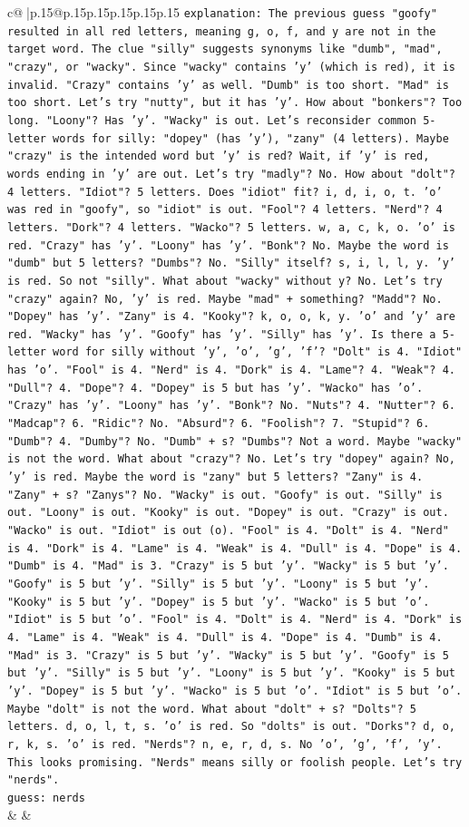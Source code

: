 \documentclass{article}
\begin{document}
{\begin{supertabular}{c@{$\;$}|p{.15\linewidth}@{}p{.15\linewidth}p{.15\linewidth}p{.15\linewidth}p{.15\linewidth}p{.15\linewidth}}
{{{                \texttt{explanation: The previous guess "goofy" resulted in all red letters, meaning g, o, f, and y are not in the target word. The clue "silly" suggests synonyms like "dumb", "mad", "crazy", or "wacky". Since "wacky" contains 'y' (which is red), it is invalid. "Crazy" contains 'y' as well. "Dumb" is too short. "Mad" is too short. Let's try "nutty", but it has 'y'. How about "bonkers"? Too long. "Loony"? Has 'y'. "Wacky" is out. Let's reconsider common 5{-}letter words for silly: "dopey" (has 'y'), "zany" (4 letters). Maybe "crazy" is the intended word but 'y' is red? Wait, if 'y' is red, words ending in 'y' are out. Let's try "madly"? No. How about "dolt"? 4 letters. "Idiot"? 5 letters. Does "idiot" fit? i, d, i, o, t. 'o' was red in "goofy", so "idiot" is out. "Fool"? 4 letters. "Nerd"? 4 letters. "Dork"? 4 letters. "Wacko"? 5 letters. w, a, c, k, o. 'o' is red. "Crazy" has 'y'. "Loony" has 'y'. "Bonk"? No. Maybe the word is "dumb" but 5 letters? "Dumbs"? No. "Silly" itself? s, i, l, l, y. 'y' is red. So not "silly". What about "wacky" without y? No. Let's try "crazy" again? No, 'y' is red. Maybe "mad" + something? "Madd"? No. "Dopey" has 'y'. "Zany" is 4. "Kooky"? k, o, o, k, y. 'o' and 'y' are red. "Wacky" has 'y'. "Goofy" has 'y'. "Silly" has 'y'. Is there a 5{-}letter word for silly without 'y', 'o', 'g', 'f'? "Dolt" is 4. "Idiot" has 'o'. "Fool" is 4. "Nerd" is 4. "Dork" is 4. "Lame"? 4. "Weak"? 4. "Dull"? 4. "Dope"? 4. "Dopey" is 5 but has 'y'. "Wacko" has 'o'. "Crazy" has 'y'. "Loony" has 'y'. "Bonk"? No. "Nuts"? 4. "Nutter"? 6. "Madcap"? 6. "Ridic"? No. "Absurd"? 6. "Foolish"? 7. "Stupid"? 6. "Dumb"? 4. "Dumby"? No. "Dumb" + s? "Dumbs"? Not a word. Maybe "wacky" is not the word. What about "crazy"? No. Let's try "dopey" again? No, 'y' is red. Maybe the word is "zany" but 5 letters? "Zany" is 4. "Zany" + s? "Zanys"? No. "Wacky" is out. "Goofy" is out. "Silly" is out. "Loony" is out. "Kooky" is out. "Dopey" is out. "Crazy" is out. "Wacko" is out. "Idiot" is out (o). "Fool" is 4. "Dolt" is 4. "Nerd" is 4. "Dork" is 4. "Lame" is 4. "Weak" is 4. "Dull" is 4. "Dope" is 4. "Dumb" is 4. "Mad" is 3. "Crazy" is 5 but 'y'. "Wacky" is 5 but 'y'. "Goofy" is 5 but 'y'. "Silly" is 5 but 'y'. "Loony" is 5 but 'y'. "Kooky" is 5 but 'y'. "Dopey" is 5 but 'y'. "Wacko" is 5 but 'o'. "Idiot" is 5 but 'o'. "Fool" is 4. "Dolt" is 4. "Nerd" is 4. "Dork" is 4. "Lame" is 4. "Weak" is 4. "Dull" is 4. "Dope" is 4. "Dumb" is 4. "Mad" is 3. "Crazy" is 5 but 'y'. "Wacky" is 5 but 'y'. "Goofy" is 5 but 'y'. "Silly" is 5 but 'y'. "Loony" is 5 but 'y'. "Kooky" is 5 but 'y'. "Dopey" is 5 but 'y'. "Wacko" is 5 but 'o'. "Idiot" is 5 but 'o'. Maybe "dolt" is not the word. What about "dolt" + s? "Dolts"? 5 letters. d, o, l, t, s. 'o' is red. So "dolts" is out. "Dorks"? d, o, r, k, s. 'o' is red. "Nerds"? n, e, r, d, s. No 'o', 'g', 'f', 'y'. This looks promising. "Nerds" means silly or foolish people. Let's try "nerds".} \\
\texttt{guess: nerds} \\
            }
        }
    }
    & & \\ \\


\end{supertabular}}
\end{document}
